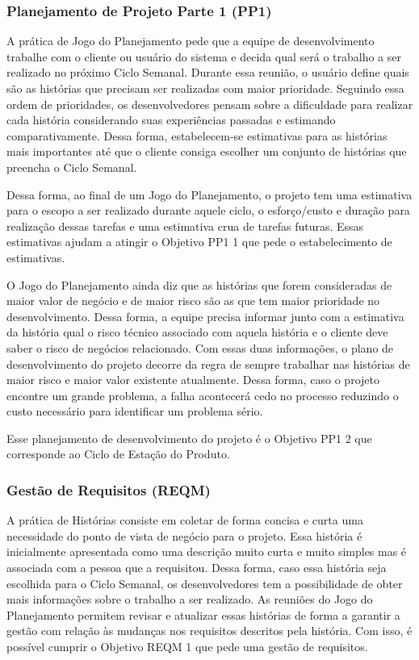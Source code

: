 \subsubsection{Planejamento de Projeto Parte 1 (PP1)}
\label{sec:+pp1}

A prática de Jogo do Planejamento pede que a equipe de desenvolvimento
trabalhe com o cliente ou usuário do sistema e decida qual será o
trabalho a ser realizado no próximo Ciclo Semanal. Durante essa
reunião, o usuário define quais são as histórias que precisam ser
realizadas com maior prioridade. Seguindo essa ordem de prioridades,
os desenvolvedores pensam sobre a dificuldade para realizar cada
história considerando suas experiências passadas e estimando
comparativamente. Dessa forma, estabelecem-se estimativas para as
histórias mais importantes até que o cliente consiga escolher um
conjunto de histórias que preencha o Ciclo Semanal.

Dessa forma, ao final de um Jogo do Planejamento, o projeto tem uma
estimativa para o escopo a ser realizado durante aquele ciclo, o
esforço/custo e duração para realização dessas tarefas e uma
estimativa crua de tarefas futuras. Essas estimativas ajudam a atingir
o Objetivo PP1 1 que pede o estabelecimento de estimativas.

O Jogo do Planejamento ainda diz que as histórias que forem
consideradas de maior valor de negócio e de maior risco são as que tem
maior prioridade no desenvolvimento. Dessa forma, a equipe precisa
informar junto com a estimativa da história qual o risco técnico
associado com aquela história e o cliente deve saber o risco de
negócios relacionado. Com essas duas informações, o plano de
desenvolvimento do projeto decorre da regra de sempre trabalhar nas
histórias de maior risco e maior valor existente atualmente. Dessa
forma, caso o projeto encontre um grande problema, a falha acontecerá
cedo no processo reduzindo o custo necessário para identificar um
problema sério.

Esse planejamento de desenvolvimento do projeto é o Objetivo PP1 2 que
corresponde ao Ciclo de Estação do Produto.

\subsubsection{Gestão de Requisitos (REQM)}
\label{sec:+reqm}

A prática de Histórias consiste em coletar de forma concisa e curta
uma necessidade do ponto de vista de negócio para o projeto. Essa
história é inicialmente apresentada como uma descrição muito curta e
muito simples mas é associada com a pessoa que a requisitou. Dessa
forma, caso essa história seja escolhida para o Ciclo Semanal, os
desenvolvedores tem a possibilidade de obter mais informações sobre o
trabalho a ser realizado. As reuniões do Jogo do Planejamento permitem
revisar e atualizar essas histórias de forma a garantir a gestão com
relação às mudanças nos requisitos descritos pela história. Com isso,
é possível cumprir o Objetivo REQM 1 que pede uma gestão de
requisitos.

